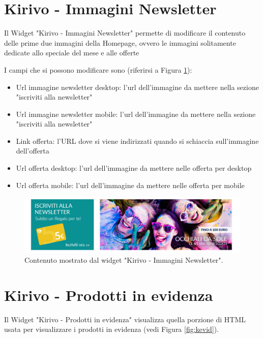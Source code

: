 
\newpage
\section{Kirivo - Immagini Newsletter}

Il Widget "Kirivo - Immagini Newsletter" permette di modificare il contenuto
delle prime due immagini della Homepage, ovvero le immagini solitamente dedicate
allo speciale del mese e alle offerte 

I campi che si possono modificare sono (riferirsi a Figura \ref{fig:knews}):
\begin{itemize}
\item Url immagine newsletter desktop: l'url dell'immagine da mettere nella sezione "iscriviti alla newsletter"
\item Url immagine newsletter mobile: l'url dell'immagine da mettere nella sezione "iscriviti alla newsletter"
\item Link offerta: l'URL dove si viene indirizzati quando si schiaccia sull'immagine dell'offerta
\item Url offerta desktop: l'url dell'immagine da mettere nelle offerta per desktop
\item Url offerta mobile: l'url dell'immagine da mettere nelle offerta per mobile
\end{itemize}

\begin{figure}
  \includegraphics[width=\textwidth]{figure/knews.png}
  \caption{Contenuto mostrato dal widget "Kirivo - Immagini Newsletter".}
  \label{fig:knews}
\end{figure}


\newpage
\section{Kirivo - Prodotti in evidenza}

Il Widget "Kirivo - Prodotti in evidenza" visualizza quella porzione di HTML usata
per visualizzare i prodotti in evidenza (vedi Figura \ref{fig:kevid}).

